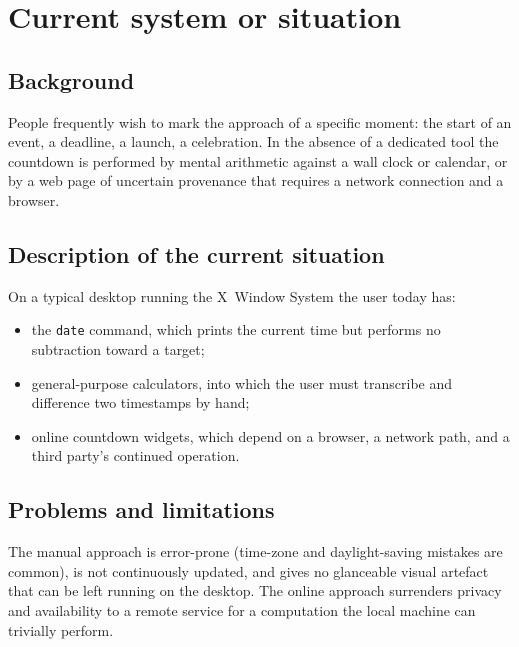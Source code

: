 \documentclass[12pt]{article}
\newcommand{\code}[1]{\texttt{#1}}
\begin{document}
\section{Current system or situation}

\subsection{Background}

People frequently wish to mark the approach of a specific moment: the
start of an event, a deadline, a launch, a celebration.  In the absence of
a dedicated tool the countdown is performed by mental arithmetic against a
wall clock or calendar, or by a web page of uncertain provenance that
requires a network connection and a browser.

\subsection{Description of the current situation}

On a typical desktop running the X~Window System the user today has:

\begin{itemize}[noitemsep]
  \item the \code{date} command, which prints the current time but
        performs no subtraction toward a target;
  \item general-purpose calculators, into which the user must transcribe
        and difference two timestamps by hand;
  \item online countdown widgets, which depend on a browser, a network
        path, and a third party's continued operation.
\end{itemize}

\subsection{Problems and limitations}

The manual approach is error-prone (time-zone and daylight-saving
mistakes are common), is not continuously updated, and gives no glanceable
visual artefact that can be left running on the desktop.  The online
approach surrenders privacy and availability to a remote service for a
computation the local machine can trivially perform.

\end{document}
